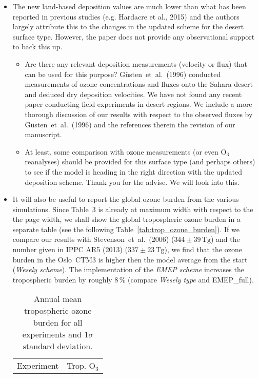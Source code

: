 \documentclass{scrartcl}
\begin{document}
\begin{itemize}
\begin{itemize}
  \item {\color{blue}  The new land-based deposition values are much lower than what has
    been reported in previous studies (e.g. Hardacre et al., 2015) and the authors largely
    attribute this to the changes in the updated scheme for the desert surface type. However,
    the paper does not provide any observational support to back this up. }
    \begin{itemize}
    \item {\color{blue}  Are there any relevant deposition measurements (velocity or flux) that can be used for this purpose?}
      G\"{u}sten~et~al.~(1996) conducted measurements of ozone concentrations
      and fluxes onto the Sahara desert and deduced dry deposition velocities.
      We have not found any recent paper conducting field experiments in desert regions. We include a more
      thorough discussion of our results with respect to the observed fluxes by G\"{u}sten~et~al.~(1996) and the
      references therein the revision of our manuscript. 
    \item {\color{blue}  At least, some comparison with ozone measurements (or even $\mathrm{O_3}$ reanalyses)
      should be provided for this surface type (and perhaps others) to see if the model is
      heading in the right direction with the updated deposition scheme.}
      Thank you for the advise. We will look into this.
    \end{itemize}
  \item {\color{blue}  It will also be useful to report the global ozone burden from the various
    simulations.}
    Since Table~3 is already at maximum width with respect to the the page width, we shall show the global
    tropospheric ozone burden in a separate table (see the following Table~\ref{tab:trop_ozone_burden}). If we compare our results
    with Stevenson~et~al.~(2006)
    ($344\pm 39\,\mathrm{Tg}$) and the number given in IPPC AR5 (2013) ($337\pm 23\,\mathrm{Tg}$), we find
    that the ozone burden in the Oslo~CTM3 is higher then the model average from the start (\emph{Wesely scheme}).
    The implementation of the \emph{EMEP scheme}
    increases the tropospheric burden by roughly 8\,\% (compare \emph{Wesely type} and EMEP\_full).
    \begin{table*}[h]
        \caption{Annual mean tropospheric ozone burden for all experiments and $1 \sigma$ standard deviation.}
        \centering
        \begin{tabular}{lrcl}
          \hline
          Experiment & \multicolumn{3}{c}{Trop. $\mathrm{O_3}$}\\

\end{tabular}
\end{table*}
\end{itemize}
\end{itemize}
\end{document}
